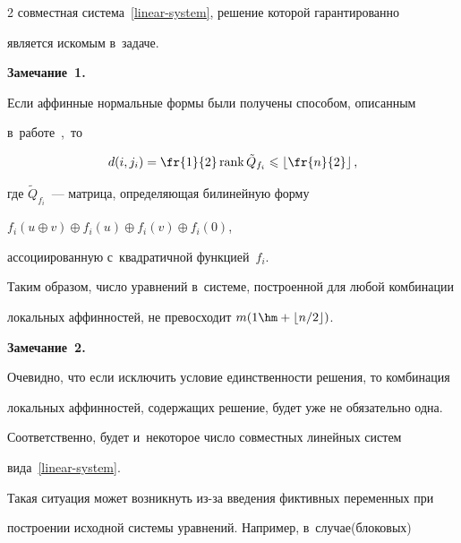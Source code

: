 \begin{multicols}{2}
совместная система~\eqref{linear-system}, решение которой гарантированно 


является искомым в~задаче.





\smallskip





\noindent


\textbf{Замечание~1.}


    Если аффинные нормальные формы были получены способом, описанным 


    в~работе~\cite{LSF2019},~то


    $$


    d(i,j_i)=\fr{1}{2}\,\rank\tilde{Q}_{f_i}\leqslant\left\lfloor\fr{n}{2}\right


    \rfloor,


    $$


    где $\tilde{Q}_{f_i}$~--- мат\-ри\-ца, определяющая билинейную форму 


$f_i(u\oplus v)\oplus f_i(u)\oplus f_i(v)\oplus f_i({0})$, 


ассоциированную с~квадратичной функцией~$f_i$.


    Таким образом, число уравнений в~системе, построенной для любой комбинации 


локальных аффинностей, не превосходит $m(1\hm+\lfloor {n}/{2}\rfloor)$.








\smallskip





\noindent


\textbf{Замечание~2.}


    Очевидно, что если исключить условие единственности решения, то комбинация 


локальных аффинностей, содержащих решение, будет уже не обязательно одна. 


Соответственно, будет и~некоторое число совместных линейных систем 


вида~\eqref{linear-system}.\par


    Такая ситуация может возникнуть из-за введения фиктивных переменных при 


построении исходной системы уравнений. Например, в~случае\linebreak (блоковых) 



\end{multicols}
